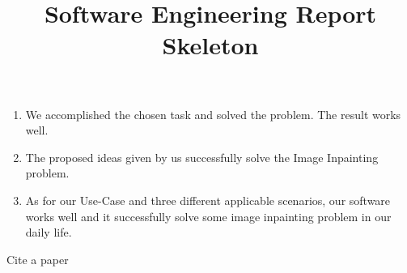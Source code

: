 \documentclass{article}
\title{Software Engineering Report Skeleton}
\begin{document}
\maketitle

\begin{enumerate}
	\item We accomplished the chosen task and solved the problem. The result works well.
	\item The proposed ideas given by us successfully solve the Image Inpainting problem.
	\item As for our Use-Case and three different applicable scenarios, our software works well and it successfully solve some image inpainting problem in our daily life. 
\end{enumerate}







\newpage
Cite a paper\cite{DBLP:conf/siggraph/BertalmioSCB00}


\end{document}
